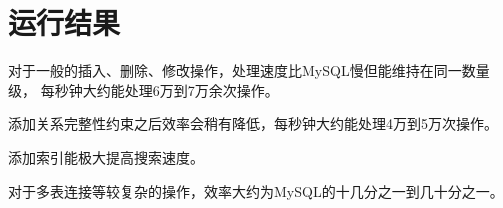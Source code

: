 \section{运行结果}
    对于一般的插入、删除、修改操作，处理速度比MySQL慢但能维持在同一数量级，%
    每秒钟大约能处理6万到7万余次操作。

    添加关系完整性约束之后效率会稍有降低，每秒钟大约能处理4万到5万次操作。

    添加索引能极大提高搜索速度。

    对于多表连接等较复杂的操作，效率大约为MySQL的十几分之一到几十分之一。
